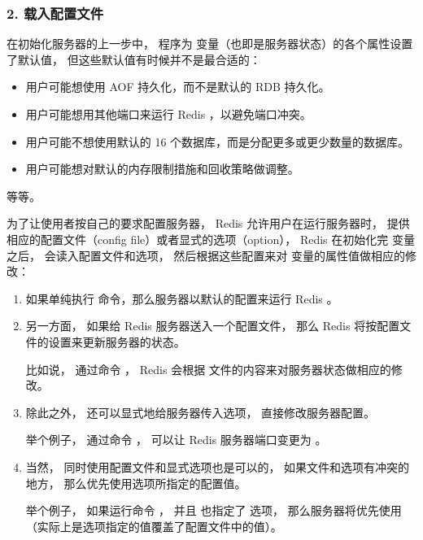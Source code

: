 \documentclass[a4paper,11pt,english]{sphinxmanual}
\begin{document}
\subsubsection{2. 载入配置文件}
\label{internal/redis:id4}
在初始化服务器的上一步中，
程序为  变量（也即是服务器状态）的各个属性设置了默认值，
但这些默认值有时候并不是最合适的：
\begin{itemize}
\item {} 
用户可能想使用 AOF 持久化，而不是默认的 RDB 持久化。

\item {} 
用户可能想用其他端口来运行 Redis ，以避免端口冲突。

\item {} 
用户可能不想使用默认的 16 个数据库，而是分配更多或更少数量的数据库。

\item {} 
用户可能想对默认的内存限制措施和回收策略做调整。

\end{itemize}

等等。

为了让使用者按自己的要求配置服务器，
Redis 允许用户在运行服务器时，
提供相应的配置文件（config file）或者显式的选项（option），
Redis 在初始化完  变量之后，
会读入配置文件和选项，
然后根据这些配置来对  变量的属性值做相应的修改：
\begin{enumerate}
\item {} 
如果单纯执行  命令，那么服务器以默认的配置来运行 Redis 。

\item {} 
另一方面， 如果给 Redis 服务器送入一个配置文件， 那么 Redis 将按配置文件的设置来更新服务器的状态。

比如说， 通过命令  ， Redis 会根据  文件的内容来对服务器状态做相应的修改。

\item {} 
除此之外， 还可以显式地给服务器传入选项， 直接修改服务器配置。

举个例子， 通过命令  ， 可以让 Redis 服务器端口变更为  。

\item {} 
当然， 同时使用配置文件和显式选项也是可以的， 如果文件和选项有冲突的地方， 那么优先使用选项所指定的配置值。

举个例子， 如果运行命令  ， 并且  也指定了  选项， 那么服务器将优先使用  （实际上是选项指定的值覆盖了配置文件中的值）。

\end{enumerate}
\end{document}
